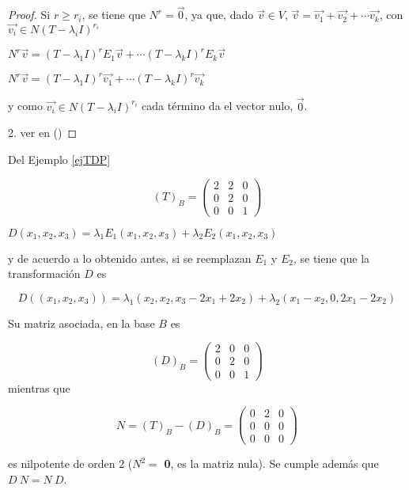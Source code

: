 \begin{corollary}
\begin{proof}
Si $r\ge r_i$, se tiene que $N^r= \Vec{0}$, ya que, 
dado $\Vec{v}  \in V$,  $\Vec{v}= \Vec{v_1} + \Vec{v_2}  + \cdots \Vec{v_k}$, con $\Vec{v_i} \in N(T- \lambda_i I)^{r_i}$

\bigskip

$N^r \Vec{v} = (T-\lambda_1 I)^r E_1 \Vec{v} + \cdots  (T-\lambda_k I)^r E_k \Vec{v}$ 

\bigskip

$N^r \Vec{v} = (T-\lambda_1 I)^r  \Vec{v_1} + \cdots  (T-\lambda_k I)^r  \Vec{v_k}$ 

\bigskip

\noindent
y como $\Vec{v_i} \in N(T- \lambda_i I)^{r_i}$ cada término  da el vector nulo, $\Vec{0}$.

2. ver en (\cite{hoffman})
\end{proof}
\end{corollary}


\bigskip

\begin{example}
 Del Ejemplo \ref{ejTDP} 

 $$(T)_B=\left(\begin{array}{ccc} 2 & 2 &  0 \\ 0 & 2 & 0
\\ 0 & 0 & 1
\end{array}
 \right)$$
\bigskip
 
\noindent
$D(x_1,x_2,x_3)= \lambda_1 E_1(x_1,x_2,x_3) + \lambda_2 E_2(x_1,x_2,x_3) $

\bigskip

\noindent
y de acuerdo a lo obtenido antes, si se reemplazan $E_1$ y $E_2$, se tiene que  la transformación $D$ es 

$$D((x_1,x_2,x_3))=  \lambda_1 (x_2,x_2, x_3-2x_1+2x_2)   + \lambda_2 (x_1-x_2,0, 2x_1-2x_2)$$

\bigskip
\noindent
Su matriz asociada, en la base $B$ es

\bigskip

$$(D)_B=\left(\begin{array}{ccc} 2 & 0 &  0 \\ 0 & 2 & 0
\\ 0 & 0 & 1
\end{array}
 \right)$$
\bigskip
\noindent
mientras que 

$$N= (T)_B-(D)_B =  \left(\begin{array}{ccc} 0 & 2 &  0 \\ 0 & 0 & 0
\\ 0 & 0 & 0
\end{array}
 \right)    $$ 
\bigskip
 
\noindent
es nilpotente de orden $2$ ($N^2= $  \textbf{0}, es la matriz nula). Se cumple además que $D ~N =N ~D$.



 
\end{example}



